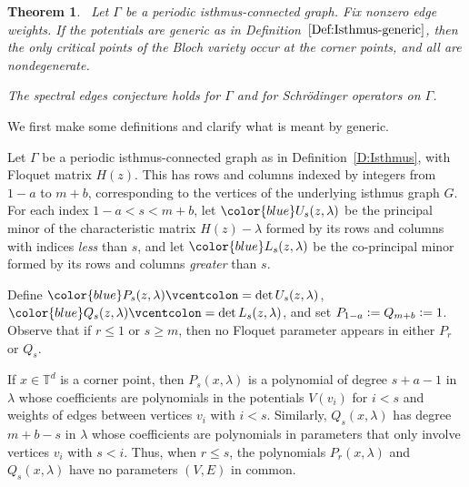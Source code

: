 \documentclass[12pt]{amsart}
\newtheorem{Theorem}{Theorem}[section]
\theoremstyle{remark}
\newenvironment{Definition}
{\pushQED{\qed}\renewcommand{\qedsymbol}{$\diamond$}\definition}
{\popQED\enddefinition}
\newcommand{\TT}{{\mathbb T}}
\newcommand{\defcolor}[1]{{\color{blue}#1}}
\begin{document}
\begin{Theorem}~\label{Thm:RealFamPath}
  Let $\Gamma$ be a periodic isthmus-connected graph.
  Fix nonzero edge weights.
  If the potentials are generic as in Definition~$\ref{Def:Isthmus-generic}$, then the only critical points of the Bloch variety occur at
  the corner points, and all are nondegenerate.

  The spectral edges conjecture holds for $\Gamma$ and for Schr\"odinger operators on $\Gamma$.
\end{Theorem}

We first make some definitions and clarify what is meant by generic.

\begin{Definition}\label{Def:minors}
 Let $\Gamma$ be a periodic isthmus-connected graph as in Definition~\ref{D:Isthmus}, with Floquet matrix $H(z)$.
 This has rows and columns indexed by integers from $1{-}a$ to $m{+}b$, corresponding to the vertices of the underlying
 isthmus graph $G$.
 For each index $1{-}a < s < m{+}b$, let $\defcolor{U_s(z,\lambda)}$ be the principal minor of the characteristic matrix
 $H(z)-\lambda$ formed by its rows and columns with indices {\sl less} than $s$, and let $\defcolor{L_s(z,\lambda)}$ be
 the co-principal minor formed by its rows and columns {\sl greater} than $s$.

 Define $\defcolor{P_s(z,\lambda)}\vcentcolon=\det U_s(z,\lambda)$, 
 $\defcolor{Q_s(z,\lambda)}\vcentcolon=\det L_s(z,\lambda)$, and set $P_{1-a}\vcentcolon=Q_{m+b}\vcentcolon=1$.
 Observe that if $r\leq 1$ or $s\geq m$, then no Floquet parameter appears in either $P_r$ or $Q_s$.
\end{Definition}

If $x\in\TT^d$ is a corner point, then $P_s(x,\lambda)$ is a polynomial  of degree $s{+}a{-}1$ in $\lambda$ whose coefficients
are polynomials in the potentials $V(v_i)$ for $i<s$ and weights of edges between vertices $v_i$ with $i<s$.
Similarly, $Q_s(x,\lambda)$ has degree $m+b-s$ in $\lambda$ whose coefficients are polynomials in  parameters that only involve
vertices $v_i$ with $s<i$. 
Thus, when $r\leq s$, the polynomials $P_r(x,\lambda)$ and $Q_s(x,\lambda)$ have no parameters $(V,E)$ in common.
\end{document}
